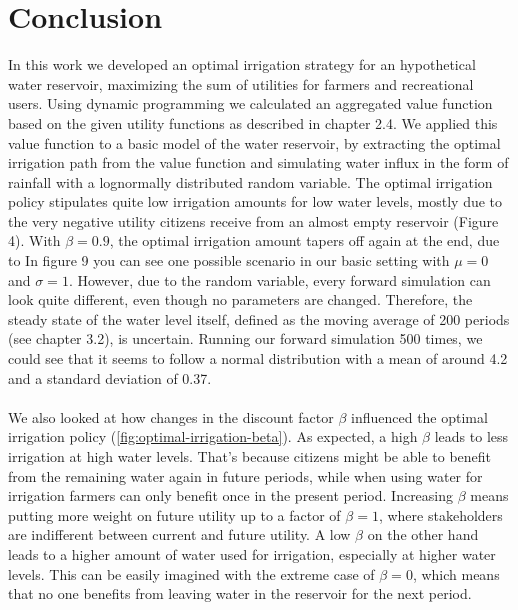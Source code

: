 \documentclass[12pt, a4paper, oneside]{article}
\begin{document}
\section{Conclusion}
In this work we developed an optimal irrigation strategy for an hypothetical water reservoir, maximizing the sum of utilities for farmers and recreational users.
Using dynamic programming we calculated an aggregated value function based on the given utility functions as described in chapter 2.4.
We applied this value function to a basic model of the water reservoir, by extracting the optimal irrigation path from the value function and simulating water influx in the form of rainfall with a lognormally distributed random variable.
The optimal irrigation policy stipulates quite low irrigation amounts for low water levels, mostly due to the very negative utility citizens receive from an almost empty reservoir (Figure 4).
With $\beta = 0.9$, the optimal irrigation amount tapers off again at the end, due to %
In figure 9 you can see one possible scenario in our basic setting with $\mu=0$ and $\sigma=1$.
However, due to the random variable, every forward simulation can look quite different, even though no parameters are changed.
Therefore, the steady state of the water level itself, defined as the moving average of 200 periods (see chapter 3.2), is uncertain.
Running our forward simulation 500 times, we could see that it seems to follow a normal distribution with a mean of around 4.2 and a standard deviation of 0.37. %
\\\\
We also looked at how changes in the discount factor $\beta$ influenced the optimal irrigation policy (\ref{fig:optimal-irrigation-beta}).
As expected, a high $\beta$ leads to less irrigation at high water levels.
That's because citizens might be able to benefit from the remaining water again in future periods, while when using water for irrigation farmers can only benefit once in the present period.
Increasing $\beta$ means putting more weight on future utility up to a factor of $\beta = 1$, where stakeholders are indifferent between current and future utility.
A low $\beta$ on the other hand leads to a higher amount of water used for irrigation, especially at higher water levels. 
This can be easily imagined with the extreme case of $\beta = 0$, which means that no one benefits from leaving water in the reservoir for the next period.
\end{document}
